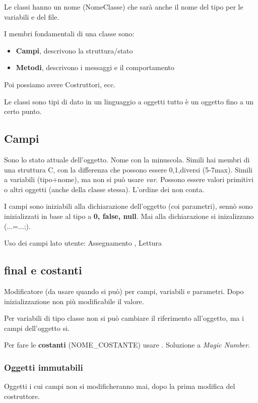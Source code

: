 Le classi hanno un nome (NomeClasse) che sarà anche il nome del tipo per le variabili e del file.

I membri fondamentali di una classe sono:
\begin{itemize}
	\item \textbf{Campi}, descrivono la struttura/stato
	\item \textbf{Metodi}, descrivono i messaggi e il comportamento
\end{itemize}
Poi possiamo avere Costruttori, ecc.

Le classi sono tipi di dato in un linguaggio a oggetti tutto è un oggetto fino a un certo punto.


\subsection{Campi}
Sono lo stato attuale dell'oggetto. Nome con la minuscola.
Simili hai membri di una struttura C, con la differenza che possono essere 0,1,diversi (5-7max). Simili a variabili (tipo+nome), ma non si può usare \textit{var}.
Possono essere valori primitivi o altri oggetti (anche della classe stessa).
L'ordine dei non conta.

I campi sono iniziabili alla dichiarazione dell'oggetto (coi parametri), sennò sono inizializzati in base al tipo a \textbf{0, false, null}. Mai alla dichiarazione si inizalizzano (...=...;).


Uso dei campi lato utente: Assegnamento , Lettura 

\subsection{final e costanti}
Modificatore (da usare quando si può) per campi, variabili e parametri. Dopo inizializzazione non più modificabile il valore.

Per variabili di tipo classe non si può cambiare il riferimento all'oggetto, ma i campi dell'oggetto si.


Per fare le \textbf{costanti} (NOME\_COSTANTE) usare . Soluzione a \textit{Magic Number}.

\subsubsection{Oggetti immutabili}
Oggetti i cui campi non si modificheranno mai, dopo la prima modifica del costruttore.

